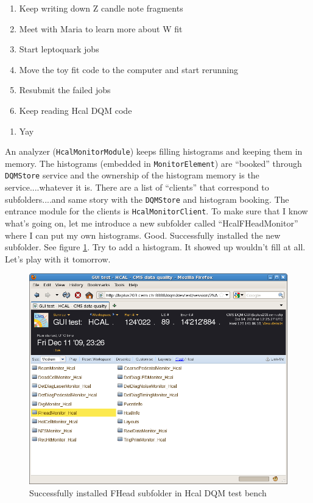 

\begin{enumerate}
\item Keep writing down Z candle note fragments
\item Meet with Maria to learn more about W fit
\item Start leptoquark jobs
\item Move the toy fit code to the computer and start rerunning
\item Resubmit the failed jobs
\item Keep reading Hcal DQM code
\end{enumerate}


\begin{enumerate}
\item Yay
\end{enumerate}


An analyzer (\texttt{HcalMonitorModule}) keeps filling histograms and keeping them in memory.
The histograms (embedded in \texttt{MonitorElement}) are ``booked'' through \texttt{DQMStore} service and the ownership of the histogram memory is the service....whatever it is.
There are a list of ``clients'' that correspond to subfolders....and same story with the \texttt{DQMStore} and histogram booking.
The entrance module for the clients is \texttt{HcalMonitorClient}.  To make sure that I know what's going on,
let me introduce a new subfolder called ``HcalFHeadMonitor'' where I can put my own histograms.
Good.  Successfully installed the new subfolder.  See figure \ref{6314_InstalledFHeadMonitorScreenShot}.
Try to add a histogram.  It showed up wouldn't fill at all.  Let's play with it tomorrow.

\begin{figure}
\includegraphics[width=120mm]{DailyLog/6314/6314HcalFHeadMonitor.png}
\caption{Successfully installed FHead subfolder in Hcal DQM test bench}
\label{6314_InstalledFHeadMonitorScreenShot}
\end{figure}


